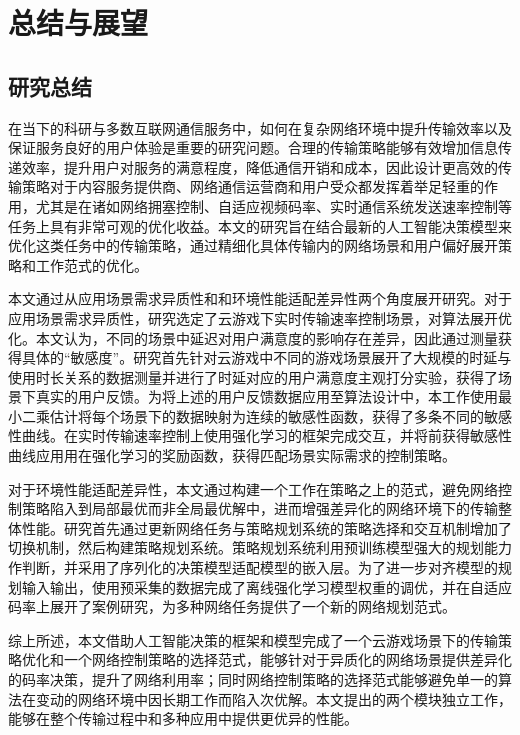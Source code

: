 
\chapter{总结与展望}
\section{研究总结}
在当下的科研与多数互联网通信服务中，如何在复杂网络环境中提升传输效率以及保证服务良好的用户体验是重要的研究问题。合理的传输策略能够有效增加信息传递效率，提升用户对服务的满意程度，降低通信开销和成本，因此设计更高效的传输策略对于内容服务提供商、网络通信运营商和用户受众都发挥着举足轻重的作用，尤其是在诸如网络拥塞控制、自适应视频码率、实时通信系统发送速率控制等任务上具有非常可观的优化收益。本文的研究旨在结合最新的人工智能决策模型来优化这类任务中的传输策略，通过精细化具体传输内的网络场景和用户偏好展开策略和工作范式的优化。

本文通过从应用场景需求异质性和和环境性能适配差异性两个角度展开研究。对于应用场景需求异质性，研究选定了云游戏下实时传输速率控制场景，对算法展开优化。本文认为，不同的场景中延迟对用户满意度的影响存在差异，因此通过测量获得具体的“敏感度”。研究首先针对云游戏中不同的游戏场景展开了大规模的时延与使用时长关系的数据测量并进行了时延对应的用户满意度主观打分实验，获得了场景下真实的用户反馈。为将上述的用户反馈数据应用至算法设计中，本工作使用最小二乘估计将每个场景下的数据映射为连续的敏感性函数，获得了多条不同的敏感性曲线。在实时传输速率控制上使用强化学习的框架完成交互，并将前获得敏感性曲线应用用在强化学习的奖励函数，获得匹配场景实际需求的控制策略。

对于环境性能适配差异性，本文通过构建一个工作在策略之上的范式，避免网络控制策略陷入到局部最优而非全局最优解中，进而增强差异化的网络环境下的传输整体性能。研究首先通过更新网络任务与策略规划系统的策略选择和交互机制增加了切换机制，然后构建策略规划系统。策略规划系统利用预训练模型强大的规划能力作判断，并采用了序列化的决策模型适配模型的嵌入层。为了进一步对齐模型的规划输入输出，使用预采集的数据完成了离线强化学习模型权重的调优，并在自适应码率上展开了案例研究，为多种网络任务提供了一个新的网络规划范式。

综上所述，本文借助人工智能决策的框架和模型完成了一个云游戏场景下的传输策略优化和一个网络控制策略的选择范式，能够针对于异质化的网络场景提供差异化的码率决策，提升了网络利用率；同时网络控制策略的选择范式能够避免单一的算法在变动的网络环境中因长期工作而陷入次优解。本文提出的两个模块独立工作，能够在整个传输过程中和多种应用中提供更优异的性能。

